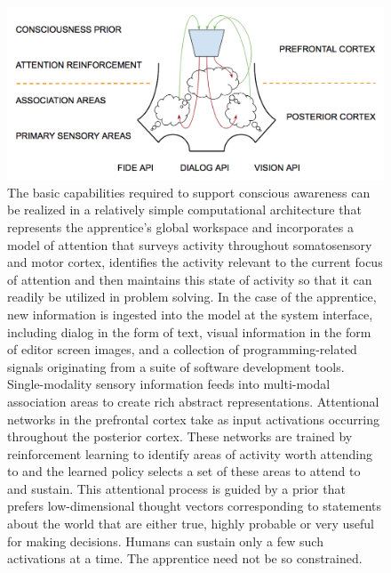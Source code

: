 \begin{figure}
%
  \begin{center} 
    \includegraphics[width=325pt]{./figures/Global_Workspace_Conscious_Attention.png} %
  \end{center}
%
  \caption{The basic capabilities required to support conscious awareness can be realized in a relatively simple computational architecture that represents the apprentice's global workspace and incorporates a model of attention that surveys activity throughout somatosensory and motor cortex, identifies the activity relevant to the current focus of attention and then maintains this state of activity so that it can readily be utilized in problem solving.  In the case of the apprentice, new information is ingested into the model at the system interface, including dialog in the form of text, visual information in the form of editor screen images, and a collection of programming-related signals originating from a suite of software development tools. 
%
Single-modality sensory information feeds into multi-modal association areas to create rich abstract representations. Attentional networks in the prefrontal cortex take as input activations occurring throughout the posterior cortex. These networks are trained by reinforcement learning to identify areas of activity worth attending to and the learned policy selects a set of these areas to attend to and sustain. This attentional process is guided by a prior that prefers low-dimensional thought vectors corresponding to statements about the world that are either true, highly probable or very useful for making decisions. Humans can sustain only a few such activations at a time. The apprentice need not be so constrained.}
%
  \label{fig_Global_Workspace_Conscious_Attention}
%
\end{figure}


